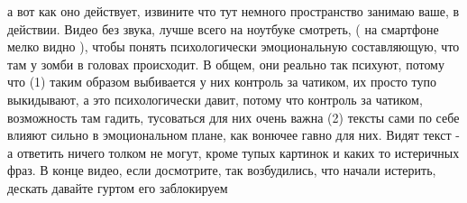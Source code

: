  
 
 
 
 

а вот как оно действует, извините что тут немного пространство занимаю ваше, в
действии. Видео без звука, лучше всего на ноутбуке смотреть, ( на смартфоне
мелко видно ), чтобы понять психологически эмоциональную составляющую, что там
у зомби в головах происходит. В общем, они реально так психуют, потому что (1)
таким образом выбивается у них контроль за чатиком, их просто тупо выкидывают,
а это психологически давит, потому что контроль за чатиком, возможность там
гадить, тусоваться для них очень важна (2) тексты сами по себе влияют сильно в
эмоциональном плане, как вонючее гавно для них. Видят текст - а ответить ничего
толком не могут, кроме тупых картинок и каких то истеричных фраз. В конце
видео, если досмотрите, так возбудились, что начали истерить, дескать давайте
гуртом его заблокируем
